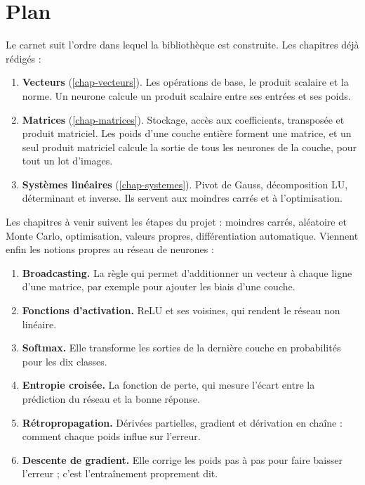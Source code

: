 \section{Plan}

Le carnet suit l'ordre dans lequel la bibliothèque
est construite. Les chapitres déjà rédigés :
\begin{enumerate}
    \item \textbf{Vecteurs} (\cref{chap-vecteurs}).
          Les opérations de base, le produit
          scalaire et la norme. Un neurone calcule
          un produit scalaire entre ses entrées et
          ses poids.
    \item \textbf{Matrices} (\cref{chap-matrices}).
          Stockage, accès aux coefficients,
          transposée et produit matriciel. Les poids
          d'une couche entière forment une matrice,
          et un seul produit matriciel calcule la
          sortie de tous les neurones de la couche,
          pour tout un lot d'images.
    \item \textbf{Systèmes linéaires}
          (\cref{chap-systemes}). Pivot de Gauss,
          décomposition LU, déterminant et inverse.
          Ils servent aux moindres carrés et à
          l'optimisation.
\end{enumerate}

Les chapitres à venir suivent les étapes du projet :
moindres carrés, aléatoire et Monte Carlo,
optimisation, valeurs propres, différentiation
automatique. Viennent enfin les notions propres au
réseau de neurones :
\begin{enumerate}[resume]
    \item \textbf{Broadcasting.} La règle qui permet
          d'additionner un vecteur à chaque ligne
          d'une matrice, par exemple pour ajouter
          les biais d'une couche.
    \item \textbf{Fonctions d'activation.} ReLU et
          ses voisines, qui rendent le réseau non
          linéaire.
    \item \textbf{Softmax.} Elle transforme les
          sorties de la dernière couche en
          probabilités pour les dix classes.
    \item \textbf{Entropie croisée.} La fonction de
          perte, qui mesure l'écart entre la
          prédiction du réseau et la bonne réponse.
    \item \textbf{Rétropropagation.} Dérivées
          partielles, gradient et dérivation en
          chaîne : comment chaque poids influe sur
          l'erreur.
    \item \textbf{Descente de gradient.} Elle
          corrige les poids pas à pas pour faire
          baisser l'erreur ; c'est l'entraînement
          proprement dit.
\end{enumerate}

